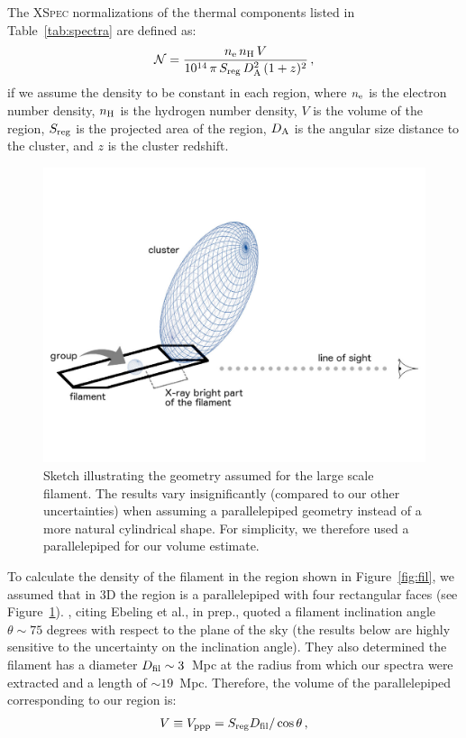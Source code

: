 The \textsc{XSpec} normalizations of the thermal components listed in Table~\ref{tab:spectra} are defined as:
\begin{equation}
	\mathcal{N} = \frac{n_{\rm e} \, n_{\rm H} \, V}{10^{14} \, \pi \, S_{\rm reg} \, D_{\rm A}^2 \, (1+z)^2} \, , 
\label{eq:norm}
\end{equation}
if we assume the density to be constant in each region, where $n_{\rm e}$ is the electron number density, $n_{\rm H}$ is the hydrogen number density, $V$ is the volume of the region, $S_{\rm reg}$ is the projected area of the region, $D_{\rm A}$ is the angular size distance to the cluster, and $z$ is the cluster redshift.

\begin{figure}
	\includegraphics[width=\columnwidth, trim=0 3cm 0 2cm, clip=True]{plots/macs0717-sketch.pdf}
	\caption{Sketch illustrating the geometry assumed for the large scale filament. The results vary insignificantly (compared to our other uncertainties) when assuming a parallelepiped geometry instead of a more natural cylindrical shape. For simplicity, we therefore used a parallelepiped for our volume estimate. \label{fig:sketch}}
\end{figure}

To calculate the density of the filament in the region shown in Figure~\ref{fig:fil}, we assumed that in 3D the region is a parallelepiped with four rectangular faces (see Figure~\ref{fig:sketch}). \citet{Jauzac2012}, citing Ebeling et al., in prep., quoted a filament inclination angle $\theta \sim 75$ degrees with respect to the plane of the sky (the results below are highly sensitive to the uncertainty on the inclination angle). They also determined the filament has a diameter $D_{\rm fil} \sim 3$~Mpc at the radius from which our spectra were extracted and a length of $\sim 19$~Mpc. Therefore, the volume of the parallelepiped corresponding to our region is:
\begin{eqnarray}
    V \equiv V_{\rm ppp} = S_{\rm reg} D_{\rm fil} / \cos\theta\, , 
\label{eq:v_ppp}
\end{eqnarray}

